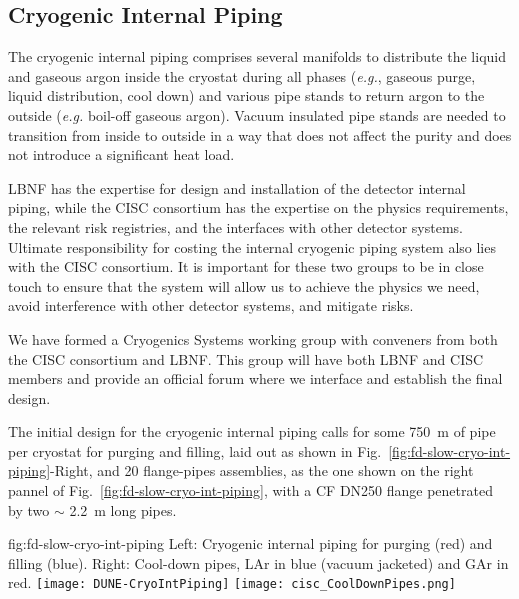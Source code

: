 \subsection{Cryogenic Internal Piping}
\label{sec:fdgen-slow-cryo-int-piping}
\label{sec:fdsp-slow-cryo-int-piping}
\label{sec:fddp-slow-cryo-int-piping}


The cryogenic internal piping comprises several manifolds to
distribute the liquid and gaseous argon inside the cryostat during all
phases ({\em e.g.}, gaseous purge, liquid distribution, cool down) and
various pipe stands to return argon to the outside ({\em e.g.}
boil-off gaseous argon).  Vacuum insulated pipe stands are needed to
transition from inside to outside in a way that does not affect the
purity and does not introduce a significant heat load.

LBNF has the expertise for design and installation of the detector
internal piping, while the CISC consortium has the expertise on the
physics requirements, the relevant risk registries, and the interfaces
with other detector systems. Ultimate responsibility for costing the
internal cryogenic piping system also lies with the CISC
consortium. It is important for these two groups to be in close touch
to ensure that the system will allow us to achieve the physics we
need, avoid interference with other detector systems, and mitigate
risks.

We have formed a Cryogenics Systems working group with conveners from
both the CISC consortium and LBNF. This group will have both LBNF and
CISC members and provide an official forum where we interface and
establish the final design.

The initial design for the cryogenic internal piping calls for some
\SI{750}{m} of pipe per cryostat for purging and filling, laid out as
shown in Fig.~\ref{fig:fd-slow-cryo-int-piping}-Right, and 20 flange-pipes assemblies, as the one shown
on the right pannel of Fig.~\ref{fig:fd-slow-cryo-int-piping}, with a CF DN250 flange penetrated by two $\sim$ \SI{2.2}{m} long pipes.

\begin{dunefigure}{fig:fd-slow-cryo-int-piping}
  {Left: Cryogenic internal piping for purging (red) and filling (blue). Right: Cool-down pipes, LAr in blue (vacuum jacketed) and GAr in red. }
  \texttt{[image: DUNE-CryoIntPiping]}
  \texttt{[image: cisc\_CoolDownPipes.png]}
\end{dunefigure}



